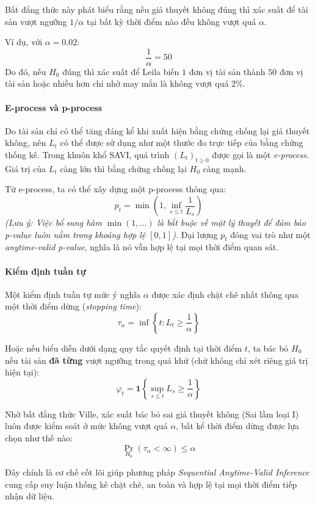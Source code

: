 Bất đẳng thức này phát biểu rằng nếu giả thuyết không đúng thì xác suất để tài sản vượt ngưỡng $1/\alpha$ tại bất kỳ thời điểm nào đều không vượt quá $\alpha$.

Ví dụ, với $\alpha=0.02$:
\begin{equation}
    \frac{1}{\alpha} = 50
\end{equation}
Do đó, nếu $H_0$ đúng thì xác suất để Leila biến $1$ đơn vị tài sản thành $50$ đơn vị tài sản hoặc nhiều hơn chỉ nhờ may mắn là không vượt quá $2\%$.

\paragraph{E-process và p-process}

Do tài sản chỉ có thể tăng đáng kể khi xuất hiện bằng chứng chống lại giả thuyết không, nên $L_t$ có thể được sử dụng như một thước đo trực tiếp của bằng chứng thống kê. Trong khuôn khổ SAVI, quá trình $(L_t)_{t\ge0}$ được gọi là một \textit{e-process}. Giá trị của $L_t$ càng lớn thì bằng chứng chống lại $H_0$ càng mạnh.

Từ e-process, ta có thể xây dựng một p-process thông qua:
\begin{equation}
    p_t = \min\left(1, \inf_{s\le t} \frac{1}{L_s}\right)
\end{equation}
\textit{(Lưu ý: Việc bổ sung hàm $\min(1,\dots)$ là bắt buộc về mặt lý thuyết để đảm bảo p-value luôn nằm trong khoảng hợp lệ $[0,1]$).} Đại lượng $p_t$ đóng vai trò như một \textit{anytime-valid p-value}, nghĩa là nó vẫn hợp lệ tại mọi thời điểm quan sát.

\paragraph{Kiểm định tuần tự}

Một kiểm định tuần tự mức ý nghĩa $\alpha$ được xác định chặt chẽ nhất thông qua một thời điểm dừng (\textit{stopping time}):
\begin{equation}
    \tau_\alpha = \inf\left\{t : L_t \ge \frac{1}{\alpha}\right\}
\end{equation}

Hoặc nếu biểu diễn dưới dạng quy tắc quyết định tại thời điểm $t$, ta bác bỏ $H_0$ nếu tài sản \textbf{đã từng} vượt ngưỡng trong quá khứ (chứ không chỉ xét riêng giá trị hiện tại):
\begin{equation}
    \varphi_t = \mathbf{1}\left\{\sup_{s\le t} L_s \ge \frac{1}{\alpha}\right\}
\end{equation}

Nhờ bất đẳng thức Ville, xác suất bác bỏ sai giả thuyết không (Sai lầm loại I) luôn được kiểm soát ở mức không vượt quá $\alpha$, bất kể thời điểm dừng được lựa chọn như thế nào:
\begin{equation}
    \Pr_{H_0}(\tau_\alpha < \infty) \le \alpha
\end{equation}

Đây chính là cơ chế cốt lõi giúp phương pháp \textit{Sequential Anytime-Valid Inference} cung cấp suy luận thống kê chặt chẽ, an toàn và hợp lệ tại mọi thời điểm tiếp nhận dữ liệu.
